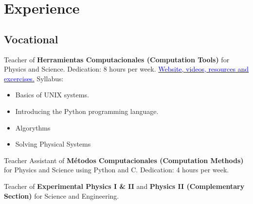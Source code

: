 \documentclass[11pt,a4paper,sans]{moderncv} %
\begin{document}





\section{Experience}

\subsection{Vocational}

{Teacher of \textbf{Herramientas Computacionales (Computation Tools)} for Physics and Science. 
Dedication: 8 hours per week.
\newline
\href{https://github.com/ComputoCienciasUniandes/HerramientasComputacionales/tree/master/Lectures/98.Python}
{\textcolor{blue}{Website, videos, resources and excercises.}}
\newline{}
Syllabus:
\begin{itemize}
\item Basics of UNIX systems.
\item Introducing the Python programming language.
\item Algorythms
\item Solving Physical Systems
\end{itemize}}

{Teacher Assistant of \textbf{M\'etodos Computacionales (Computation Methods)} for Physics and Science
using Python and C. Dedication: 4 hours per week.}


{Teacher of \textbf{Experimental Physics I \& II} and \textbf{Physics II (Complementary Section)} 
for Science and Engineering.}
\end{document}
